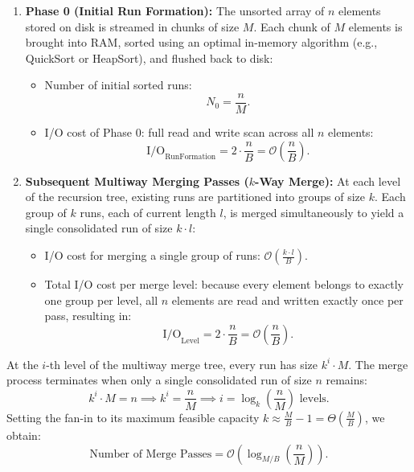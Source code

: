 \begin{enumerate}
  \item \textbf{Phase 0 (Initial Run Formation):}
  The unsorted array of $n$ elements stored on disk is streamed in chunks of size $M$. Each chunk of $M$ elements is brought into RAM, sorted using an optimal in-memory algorithm (e.g., QuickSort or HeapSort), and flushed back to disk:
  \begin{itemize}
    \item Number of initial sorted runs:
    \begin{equation}
      N_0 = \frac{n}{M}.
    \end{equation}
    \item I/O cost of Phase 0: full read and write scan across all $n$ elements:
    \begin{equation}
      \mathrm{I/O}_{\text{RunFormation}} = 2 \cdot \frac{n}{B} = \mathcal{O}\left(\frac{n}{B}\right).
    \end{equation}
  \end{itemize}

  \item \textbf{Subsequent Multiway Merging Passes ($k$-Way Merge):}
  At each level of the recursion tree, existing runs are partitioned into groups of size $k$. Each group of $k$ runs, each of current length $l$, is merged simultaneously to yield a single consolidated run of size $k \cdot l$:
  \begin{itemize}
    \item I/O cost for merging a single group of runs: $\mathcal{O}\left(\frac{k \cdot l}{B}\right)$.
    \item Total I/O cost per merge level: because every element belongs to exactly one group per level, all $n$ elements are read and written exactly once per pass, resulting in:
    \begin{equation}
      \mathrm{I/O}_{\text{Level}} = 2 \cdot \frac{n}{B} = \mathcal{O}\left(\frac{n}{B}\right).
    \end{equation}
  \end{itemize}
\end{enumerate}

At the $i$-th level of the multiway merge tree, every run has size $k^i \cdot M$. The merge process terminates when only a single consolidated run of size $n$ remains:
\begin{equation}
  k^i \cdot M = n \implies k^i = \frac{n}{M} \implies i = \log_k\left(\frac{n}{M}\right) \text{ levels}.
\end{equation}
Setting the fan-in to its maximum feasible capacity $k \approx \frac{M}{B} - 1 = \Theta\left(\frac{M}{B}\right)$, we obtain:
\begin{equation}
  \text{Number of Merge Passes} = \mathcal{O}\left(\log_{M/B}\left(\frac{n}{M}\right)\right).
\end{equation}

